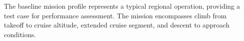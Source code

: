The baseline mission profile represents a typical regional operation, providing a test case for performance assessment. The mission encompasses climb from takeoff to cruise altitude, extended cruise segment, and descent to approach conditions.